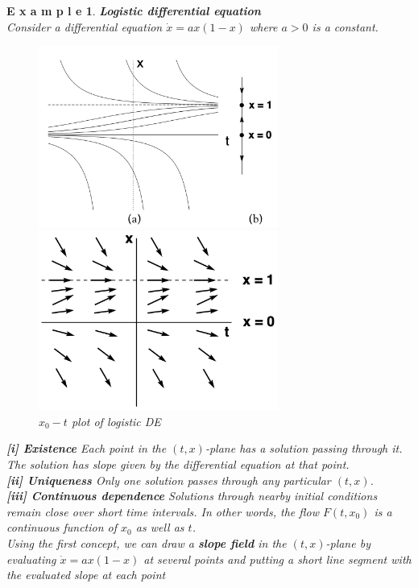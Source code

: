 \documentclass[12pt]{article}
\theoremstyle{plain}
\newtheorem{example}{\textbf{E x a m p l e}}[section]
\begin{document}
\begin{example}\textbf{Logistic differential equation}
\\\noindent Consider a differential equation $\dot x = ax(1-x)$ where $a > 0$ is a constant.
\begin{figure}[H]
\begin{minipage}[c][0.5\width]{
   0.5\textwidth}
   \centering
   \includegraphics[width=0.7\textwidth]{figure/section8/logistic-OD-tx.png}
\end{minipage}
\begin{minipage}[c][0.5\width]{
   0.5\textwidth}
   \centering
   \includegraphics[width=0.7\textwidth]{figure/section8/logistic-OD-txv.png}
\end{minipage}
\caption{$x_0-t$ plot of logistic DE}\label{logistic-DE}
\end{figure}
  \noindent \textbf{[i] Existence} Each point in the $(t,x)$-plane has a solution passing through it. The solution has slope given by the differential equation at that point.
\\\noindent \textbf{[ii] Uniqueness} Only one solution passes through any particular $(t, x)$.
\\\noindent \textbf{[iii] Continuous dependence} Solutions through nearby initial conditions remain close over short time intervals. In other words, the flow $F(t, x_0)$ is a continuous function of $x_0$ as well as $t$.
\\\noindent Using the first concept, we can draw a \textbf{slope field} in the $(t, x)$-plane by evaluating $\dot x = ax(1 - x)$ at several points and putting a short line segment with the evaluated slope at each point
\end{example}
\end{document}
